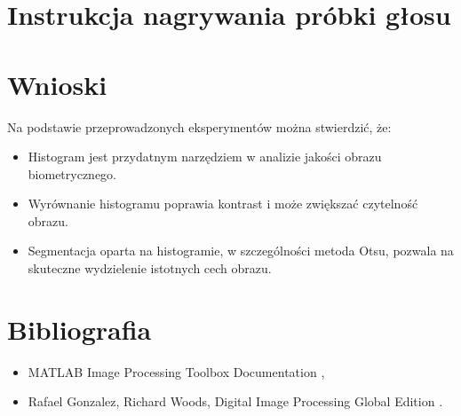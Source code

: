 \section{Instrukcja nagrywania próbki głosu}



\section{Wnioski}
Na podstawie przeprowadzonych eksperymentów można stwierdzić, że:
\begin{itemize}
    \item Histogram jest przydatnym narzędziem w analizie jakości obrazu biometrycznego.
    \item Wyrównanie histogramu poprawia kontrast i może zwiększać czytelność obrazu.
    \item Segmentacja oparta na histogramie, w szczególności metoda Otsu, pozwala na skuteczne wydzielenie istotnych cech obrazu.
\end{itemize}

\section{Bibliografia}
\begin{itemize}
    \item MATLAB Image Processing Toolbox Documentation \cite{mathworks},
    \item Rafael Gonzalez, Richard Woods, Digital Image Processing Global Edition \cite{gonzalez2017}.
\end{itemize}
